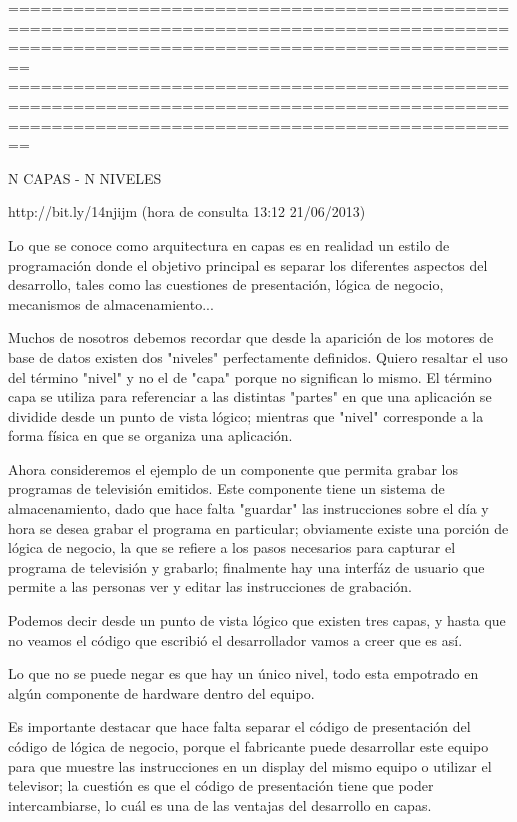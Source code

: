 ============================================================================================================================================
============================================================================================================================================

N CAPAS - N NIVELES

http://bit.ly/14njijm  (hora de consulta 13:12 21/06/2013)


Lo que se conoce como arquitectura en capas es en realidad un estilo de programación donde el objetivo principal es separar los diferentes 
aspectos del desarrollo, tales como las cuestiones de presentación, lógica de negocio, mecanismos de almacenamiento...

Muchos de nosotros debemos recordar que desde la aparición de los motores de base de datos existen dos "niveles" perfectamente definidos. 
Quiero resaltar el uso del término "nivel" y no el de "capa" porque no significan lo mismo. El término capa se utiliza para referenciar a 
las distintas "partes" en que una aplicación se dividide desde un punto de vista lógico; mientras que "nivel" corresponde a la forma física
en que se organiza una aplicación.

Ahora consideremos el ejemplo de un componente que permita grabar los programas de televisión emitidos. Este componente tiene un sistema de 
almacenamiento, dado que hace falta "guardar" las instrucciones sobre el día y hora se desea grabar el programa en particular; obviamente 
existe una porción de lógica de negocio, la que se refiere a los pasos necesarios para capturar el programa de televisión y grabarlo; 
finalmente hay una interfáz de usuario que permite a las personas ver y editar las instrucciones de grabación.

Podemos decir desde un punto de vista lógico que existen tres capas, y hasta que no veamos el código que escribió el desarrollador vamos
a creer que es así.

Lo que no se puede negar es que hay un único nivel, todo esta empotrado en algún componente de hardware dentro del equipo.

Es importante destacar que hace falta separar el código de presentación del código de lógica de negocio, porque el fabricante puede 
desarrollar este equipo para que muestre las instrucciones en un display del mismo equipo o utilizar el televisor; la cuestión es que 
el código de presentación tiene que poder intercambiarse, lo cuál es una de las ventajas del desarrollo en capas.

